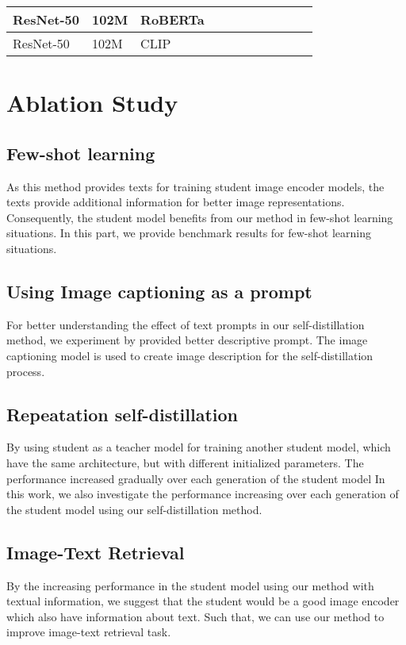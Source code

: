 \begin{table}[h]
\begin{adjustbox}{width=1\textwidth}
\begin{tabular}{|l|l|l|llll|llll|}
            ResNet-50 & 102M & RoBERTa & \multicolumn{1}{l|}{} & \multicolumn{1}{l|}{} & \multicolumn{1}{l|}{} &  & \multicolumn{1}{l|}{} & \multicolumn{1}{l|}{} & \multicolumn{1}{l|}{} &  \\ \hline
            ResNet-50 & 102M & CLIP & \multicolumn{1}{l|}{} & \multicolumn{1}{l|}{} & \multicolumn{1}{l|}{} &  & \multicolumn{1}{l|}{} & \multicolumn{1}{l|}{} & \multicolumn{1}{l|}{} &  \\ \hline
        \end{tabular}
    \end{adjustbox}
\end{table}

\section{Ablation Study}
\subsection{Few-shot learning}
As this method provides texts for training student image encoder models, the texts provide additional information for better image representations.
Consequently, the student model benefits from our method in few-shot learning situations.
In this part, we provide benchmark results for few-shot learning situations.

\subsection{Using Image captioning as a prompt}
For better understanding the effect of text prompts in our self-distillation method, we experiment by provided better descriptive prompt.
The image captioning model is used to create image description for the self-distillation process.

\subsection{Repeatation self-distillation}
By using student as a teacher model for training another student model, which have the same architecture, but with different initialized parameters.
The performance increased gradually over each generation of the student model 
In this work, we also investigate the performance increasing over each generation of the student model using our self-distillation method.

\subsection{Image-Text Retrieval}
By the increasing performance in the student model using our method with textual information, we suggest that the student would be a good image encoder which also have information about text.
Such that, we can use our method to improve image-text retrieval task.

